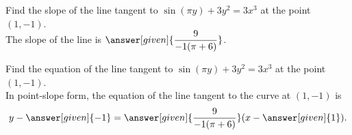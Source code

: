 \documentclass[handout]{ximera}
\begin{document}
\begin{problem}
	\begin{question}
    Find the slope of the line tangent to $\displaystyle\sin \left(\pi y\right)+3y^2=3x^3$ at the point $(1,-1)$.\\
    
    The slope of the line is $\answer[given]{\dfrac{9}{-1(\pi +6)}}$.
    \end{question}
	
	\begin{question}
    Find the equation of the line tangent to $\displaystyle\sin \left(\pi y\right)+3y^2=3x^3$ at the point $(1,-1)$. \\
    
    In point-slope form, the equation of the line tangent to the curve at $(1,-1)$ is \\
    
    \[
    y - \answer[given]{-1} = \answer[given]{\dfrac{9}{-1(\pi +6)}} ( x - \answer[given]{1}).
    \]
    \end{question}
\end{problem}
\end{document}
